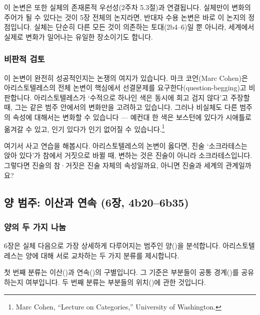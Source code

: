 \documentclass[12pt, a4paper]{article}
\begin{document}
이 논변은 또한 실체의 존재론적 우선성(2주차 5.3절)과 연결됩니다. 실체만이 변화의 주어가 될 수 있다는 것이 5장 전체의 논지라면, 반대자 수용 논변은 바로 이 논지의 정점입니다. 실체는 단순히 다른 모든 것이 의존하는 토대(2b4--6)일 뿐 아니라, 세계에서 실제로 변화가 일어나는 유일한 장소이기도 합니다.

\subsubsection{비판적 검토}

이 논변이 완전히 성공적인지는 논쟁의 여지가 있습니다. 마크 코언(Marc Cohen)은 아리스토텔레스의 전체 논변이 핵심에서 선결문제를 요구한다(question-begging)고 비판합니다. 아리스토텔레스가 `수적으로 하나인 색은 동시에 희고 검지 않다'고 주장할 때, 그는 같은 범주 안에서의 변화만을 고려하고 있습니다. 그러나 비실체도 다른 범주의 속성에 대해서는 변화할 수 있습니다 --- 예컨대 한 색은 보스턴에 있다가 시애틀로 옮겨갈 수 있고, 인기 있다가 인기 없어질 수 있습니다.\footnote{Marc Cohen, ``Lecture on Categories,'' University of Washington.}

여기서 사고 연습을 해봅시다. 아리스토텔레스의 논변이 옳다면, 진술 `소크라테스는 앉아 있다'가 참에서 거짓으로 바뀔 때, 변하는 것은 진술이 아니라 소크라테스입니다. 그렇다면 진술의 참·거짓은 진술 자체의 속성일까요, 아니면 진술과 세계의 관계일까요?

\subsection{양 범주: 이산과 연속 (6장, 4b20--6b35)}

\subsubsection{양의 두 가지 나눔}

6장은 실체 다음으로 가장 상세하게 다루어지는 범주인 양()을 분석합니다. 아리스토텔레스는 양에 대해 서로 교차하는 두 가지 분류를 제시합니다.


첫 번째 분류는 이산()과 연속()의 구별입니다. 그 기준은 부분들이 공통 경계()를 공유하는지 여부입니다. 두 번째 분류는 부분들의 위치()에 관한 것입니다.
\end{document}
